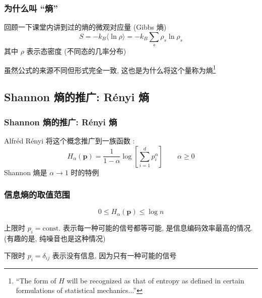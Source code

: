 \documentclass[12pt,hyperref={CJKbookmarks=true}]{beamer}
\renewcommand*{\vec}[1]{\bm{#1}}
\begin{document}
\begin{frame}
    \frametitle{为什么叫 ``熵''}
    回顾一下课堂内讲到过的熵的微观对应量 (Gibbs 熵)
    $$
        S = -k_B\langle\ln\rho\rangle = -k_B\sum_s\rho_s\ln\rho_s
    $$
    其中 $\rho$ 表示态密度 (不同态的几率分布)\pause

    虽然公式的来源不同但形式完全一致, 这也是为什么将这个量称为熵\footnote{``The form of $H$ will be recognized as that of entropy as defined in certain formulations of statistical mechanics...''\cite{Shannonentropy}}
\end{frame}
\subsection{Shannon 熵的推广: R\'enyi 熵} %
\label{sub:Renyi_entropy}
\begin{frame}
    \frametitle{Shannon 熵的推广: R\'enyi 熵}
    Alfr\'ed R\'enyi 将这个概念推广到一族函数\cite{renyientropy} :
    \begin{equation}
        H_\alpha(\vec p) = \frac1{1-\alpha}\log\left[\sum_{i=1}^dp_i^\alpha\right]\qquad\alpha\ge 0
    \end{equation}\pause
    Shannon 熵是 $\alpha\to 1$ 时的特例
\end{frame}
\begin{frame}
    \frametitle{信息熵的取值范围}
    \begin{equation}
        0\le H_\alpha(\vec p) \le\log n
    \end{equation}

    上限时 $p_i = \mbox{const.}$ 表示每一种可能的信号都等可能, 
    是信息编码效率最高的情况. (有趣的是, 纯噪音也是这种情况)

    下限时 $p_i = \delta_{ij}$ 表示没有信息, 因为只有一种可能的信号
\end{frame}
\end{document}
